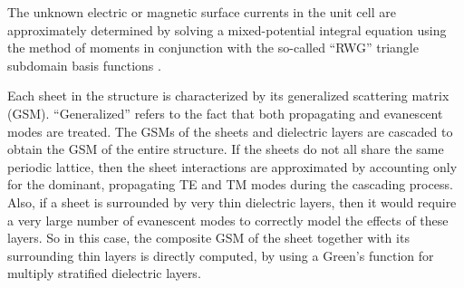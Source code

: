\documentclass[
letterpaper, %
11pt, %
oneside, 
onecolumn, %
openany, %
]{memoir}
\numberwithin{equation}{chapter}
\numberwithin{figure}{chapter}
\begin{document}
The unknown electric or magnetic surface currents in the unit cell are
approximately determined by solving a mixed-potential integral
equation using
the method of moments in conjunction with the so-called ``RWG''
triangle subdomain basis functions \cite{rawg:82}. 

Each sheet in the structure is characterized by its generalized
scattering matrix (GSM).  ``Generalized'' refers to the fact that both
propagating and evanescent modes are treated.  The GSMs of the sheets
and dielectric layers are cascaded to obtain the GSM of the entire
structure. If the sheets do not all share the same periodic lattice,
then the sheet interactions are approximated by accounting only for
the dominant, propagating TE and TM modes during the cascading
process.  Also, if a sheet is surrounded by very thin dielectric
layers, then it would require a very large number of evanescent modes
to correctly model the effects of these layers.  So in this case, the
composite GSM of the sheet together with its surrounding thin layers
is directly computed, by
using a Green's function for multiply stratified dielectric layers.
\end{document}
